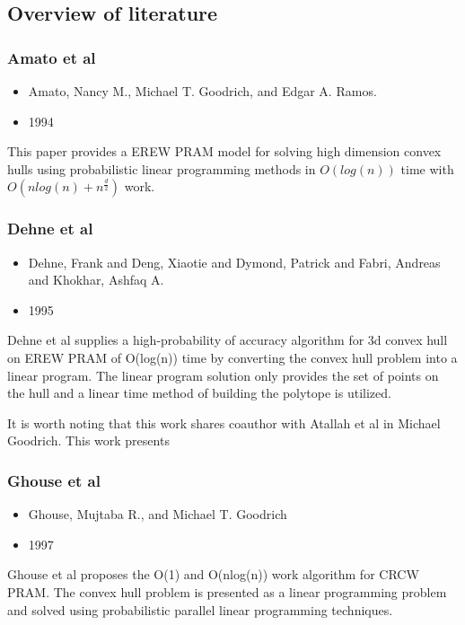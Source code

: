 \documentclass[10pt,a4paper]{report}
\begin{document}
\subsection{Overview of literature}


\subsubsection{Amato et al}

\begin{itemize}
\item{Amato, Nancy M., Michael T. Goodrich, and Edgar A. Ramos.}
\item{1994}
\end{itemize}
This paper provides a EREW PRAM model for solving high dimension convex hulls using probabilistic linear programming methods in $O(log(n))$ time with $O(nlog(n)+n^{\frac{d}{2}})$ work.

\subsubsection{Dehne et al}
\begin{itemize}
\item{Dehne, Frank and Deng, Xiaotie and Dymond, Patrick and Fabri, Andreas and Khokhar, Ashfaq A.}
\item{1995}
\end{itemize}
Dehne et al\cite{Dehne} supplies a high-probability of accuracy algorithm for 3d convex hull on EREW PRAM of O(log(n)) time by converting the convex hull problem into a linear program. The linear program solution only provides the set of points on the hull and a linear time method of building the polytope is utilized.

It is worth noting that this work shares coauthor with Atallah et al in Michael Goodrich.
This work presents 


\subsubsection{Ghouse et al}

\begin{itemize}
\item{Ghouse, Mujtaba R., and Michael T. Goodrich}
\item{1997}
\end{itemize}
Ghouse et al proposes the O(1) and O(nlog(n)) work algorithm for CRCW PRAM. The convex hull problem is presented as a linear programming problem and solved using probabilistic parallel linear programming techniques.









	
\end{document}

